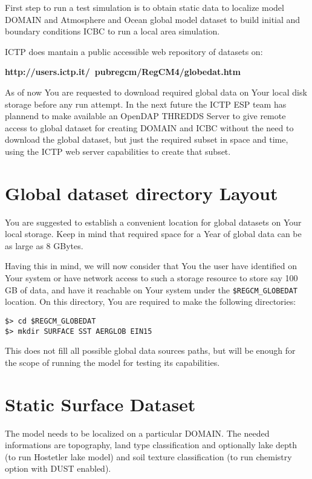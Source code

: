 %
%

First step to run a test simulation is to obtain static data to localize
model DOMAIN and Atmosphere and Ocean global model dataset to build initial
and boundary conditions ICBC to run a local area simulation.

ICTP does mantain a public accessible web repository of datasets on:

{\bf http://users.ictp.it/~pubregcm/RegCM4/globedat.htm}

As of now You are requested to download required global data on Your local disk
storage before any run attempt. In the next future the ICTP ESP team has
plannend to make available an OpenDAP THREDDS Server to give remote access
to global dataset for creating DOMAIN and ICBC without the need to
download the global dataset, but just the required subset in space and time,
using the ICTP web server capabilities to create that subset.

\section{Global dataset directory Layout}

You are suggested to establish a convenient location for global datasets
on Your local storage. Keep in mind that required space for a Year of global
data can be as large as 8 GBytes.

Having this in mind, we will now consider that You the user have identified
on Your system or have network access to such a storage resource to store say
100 GB of data, and have it reachable on Your system under the
\verb=$REGCM_GLOBEDAT= location.
On this directory, You are required to make the following directories:

\begin{Verbatim}
$> cd $REGCM_GLOBEDAT
$> mkdir SURFACE SST AERGLOB EIN15
\end{Verbatim}

This does not fill all possible global data sources paths, but will be enough
for the scope of running the model for testing its capabilities.

\section{Static Surface Dataset}

The model needs to be localized on a particular DOMAIN. The needed informations
are topography, land type classification and optionally lake depth (to run
Hostetler lake model) and soil texture classification (to run chemistry option
with DUST enabled).

